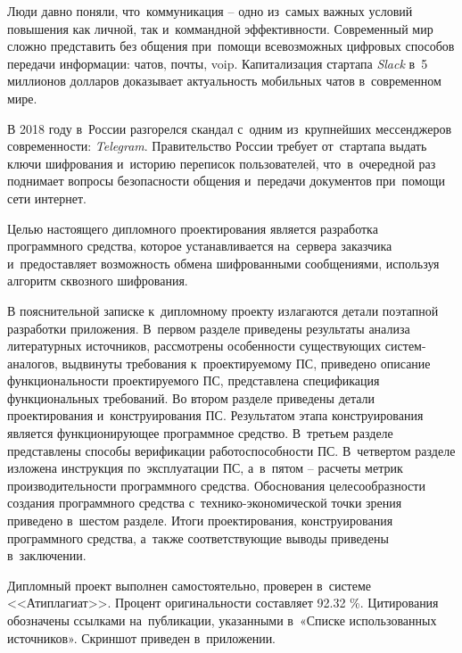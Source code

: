 
Люди давно поняли, что~коммуникация -- одно из~самых важных условий повышения как личной, так и~коммандной эффективности. Современный мир сложно представить без общения при~помощи всевозможных цифровых способов передачи информации: чатов, почты, \gls{voip}. Капитализация стартапа \textit{Slack} в~5 миллионов долларов\cite{slack:capitalization} доказывает актуальность мобильных чатов в~современном мире.

В 2018 году в~России разгорелся скандал с~одним из~крупнейших мессенджеров современности: \textit{Telegram}. Правительство России требует от~стартапа выдать ключи шифрования и~историю переписок пользователей, что~в~очередной раз поднимает вопросы безопасности общения и~передачи документов при~помощи сети интернет\cite{telegram:vs:rkn}.

Целью настоящего дипломного проектирования является разработка программного средства, которое устанавливается на~сервера заказчика и~предоставляет возможность обмена шифрованными сообщениями, используя алгоритм сквозного шифрования.

В пояснительной записке к~дипломному проекту излагаются детали поэтапной разработки приложения. В~первом разделе приведены результаты анализа литературных источников, рассмотрены особенности существующих систем-аналогов, выдвинуты требования к~проектируемому ПС, приведено описание функциональности проектируемого ПС, представлена спецификация функциональных требований. Во втором разделе приведены детали проектирования и~конструирования ПС. Результатом этапа конструирования является функционирующее программное средство. В~третьем разделе представлены способы верификации работоспособности ПС. В~четвертом разделе изложена инструкция по~эксплуатации ПС, а~в~пятом -- расчеты метрик производительности программного средства. Обоснования целесообразности создания программного средства с~технико-экономической точки зрения приведено в~шестом разделе. Итоги проектирования, конструирования программного средства, а~также соответствующие выводы приведены в~заключении.

Дипломный проект выполнен самостоятельно, проверен в~системе <<Атиплагиат>>. Процент оригинальности составляет \num{92.32} \%. Цитирования обозначены ссылками на~публикации, указанными в~«Списке использованных источников».
Скриншот приведен в~приложении.